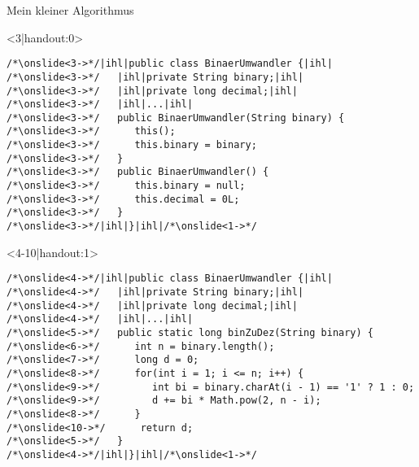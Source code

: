\SidebarSolution
\begin{frame}[fragile,c]{Mein kleiner Algorithmus}
\medskip
\SetupLstHl
{}
\begin{onlyenv}<3|handout:0>
\begin{verbatim}
/*\onslide<3->*/|ihl|public class BinaerUmwandler {|ihl|
/*\onslide<3->*/   |ihl|private String binary;|ihl|
/*\onslide<3->*/   |ihl|private long decimal;|ihl|
/*\onslide<3->*/   |ihl|...|ihl|
/*\onslide<3->*/   public BinaerUmwandler(String binary) {
/*\onslide<3->*/      this();
/*\onslide<3->*/      this.binary = binary;
/*\onslide<3->*/   }
/*\onslide<3->*/   public BinaerUmwandler() {
/*\onslide<3->*/      this.binary = null;
/*\onslide<3->*/      this.decimal = 0L;
/*\onslide<3->*/   }
/*\onslide<3->*/|ihl|}|ihl|/*\onslide<1->*/
\end{verbatim}
\end{onlyenv}
\begin{onlyenv}<4-10|handout:1>
\begin{verbatim}
/*\onslide<4->*/|ihl|public class BinaerUmwandler {|ihl|
/*\onslide<4->*/   |ihl|private String binary;|ihl|
/*\onslide<4->*/   |ihl|private long decimal;|ihl|
/*\onslide<4->*/   |ihl|...|ihl|
/*\onslide<5->*/   public static long binZuDez(String binary) {
/*\onslide<6->*/      int n = binary.length();
/*\onslide<7->*/      long d = 0;
/*\onslide<8->*/      for(int i = 1; i <= n; i++) {
/*\onslide<9->*/         int bi = binary.charAt(i - 1) == '1' ? 1 : 0;
/*\onslide<9->*/         d += bi * Math.pow(2, n - i);
/*\onslide<8->*/      }
/*\onslide<10->*/      return d;
/*\onslide<5->*/   }
/*\onslide<4->*/|ihl|}|ihl|/*\onslide<1->*/
\end{verbatim}
\end{onlyenv}

\end{frame}
